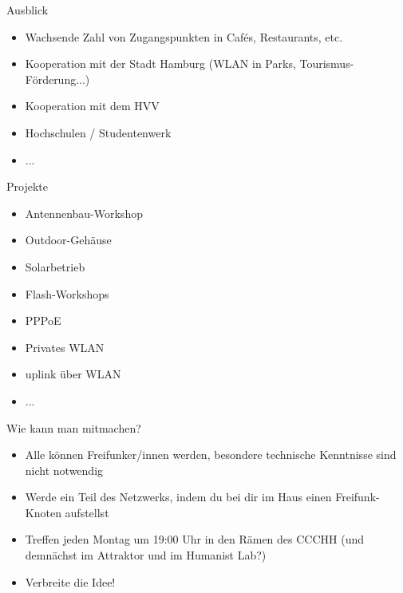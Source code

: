 \documentclass[c]{beamer}
\begin{document}
\begin{frame}{Ausblick}
	\begin{itemize}
		\item Wachsende Zahl von Zugangspunkten in Cafés, Restaurants, etc.
		\item Kooperation mit der Stadt Hamburg (WLAN in Parks, Tourismus-Förderung...)
		\item Kooperation mit dem HVV
		\item Hochschulen / Studentenwerk
		\item ...
	\end{itemize}
\end{frame}


\begin{frame}{Projekte}
	\begin{itemize}
		\item Antennenbau-Workshop
		\item Outdoor-Gehäuse
		\item Solarbetrieb
		\item Flash-Workshops
		\item PPPoE
		\item Privates WLAN
		\item uplink über WLAN
		\item ...
	\end{itemize}
\end{frame}


\begin{frame}{Wie kann man mitmachen?}
	\begin{itemize}
		\item Alle können Freifunker/innen werden, besondere technische Kenntnisse sind nicht notwendig
		\item Werde ein Teil des Netzwerks, indem du bei dir im Haus einen Freifunk-Knoten aufstellst
		\item Treffen jeden Montag um 19:00 Uhr in den Rämen des CCCHH (und demnächst im Attraktor und im Humanist Lab?)
		\item Verbreite die Idee!
	\end{itemize}
\end{frame}
\end{document}

